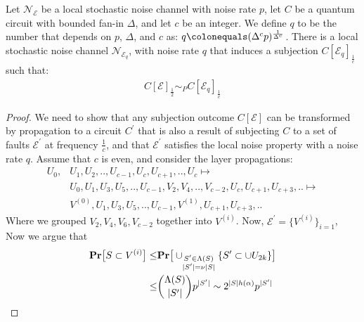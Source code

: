 \begin{claim}
  Let $\mathcal{N}_{\mathcal{E}}$ be a local stochastic noise channel with noise rate $p$, let $C$ be a quantum circuit with bounded fan-in $\Delta$, and let $c$ be an integer. We define $q$ to be the number that depends on $p$, $\Delta$, and $c$ as: $q \colonequals (\Delta^{c} p)^{\frac{1}{\Delta^{c}}}$. There is a local stochastic noise channel $\mathcal{N}_{\mathcal{E}_{q}}$, with noise rate $q$ that induces a subjection $C[\mathcal{E}_{q}]_{\frac{1}{c}}$ such that: 
  \begin{equation*}
    \begin{split}
      C[\mathcal{E}]_{\frac{1}{2}} \sim_{P} C[\mathcal{E}_{q}]_{\frac{1}{c}}
    \end{split}
  \end{equation*}
\end{claim}
\begin{proof}
  We need to show that any subjection outcome $C[\mathcal{E}]$ can be transformed by propagation to a circuit $C^{\prime}$ that is also a result of subjecting $C$ to a set of faults $\mathcal{E}^{\prime}$ at frequency $\frac{1}{c}$, and that $\mathcal{E}^{\prime}$ satisfies the local noise property with a noise rate $q$.
  Assume that $c$ is even, and consider the layer propagations:
  \begin{equation*}
    \begin{split}
      U_{0},& U_{1},U_{2},..,U_{c-1},U_{c},U_{c+1},.., U_{c} \mapsto \\ 
      & U_{0},U_{1},U_{3},U_{5},..,U_{c-1},V_{2},V_{4},..,V_{c-2},U_{c},U_{c+1},U_{c+3},.. \mapsto \\
      & V^{(0)},U_{1},U_{3},U_{5},..,U_{c-1},V^{(1)},U_{c+1},U_{c+3},.. 
    \end{split}
  \end{equation*}
  Where we grouped $V_{2},V_{4},V_{6},V_{c-2}$ together into $V^{(i)}$. Now, $\mathcal{E}^{\prime} = \{ V^{(i)} \}_{i=1}$, Now we argue that  
  \begin{equation*}
    \begin{split}
      \mathbf{Pr} \big[ S \subset V^{(i)} \big]  \le & \mathbf{Pr} \big[  \cup_{ \substack{ S^{\prime} \in \Lambda(S) \\ |S^{\prime}| = \nu |S|} } \{ S^{\prime}  \subset \cup U_{2k} \}   \big] \\
      \le & { \Lambda(S) \choose |S^{\prime}| } p^{|S^{\prime}|} \sim 2^{|S|h(\alpha)}p^{|S^{\prime}|}   
    \end{split}
  \end{equation*}
\end{proof}

